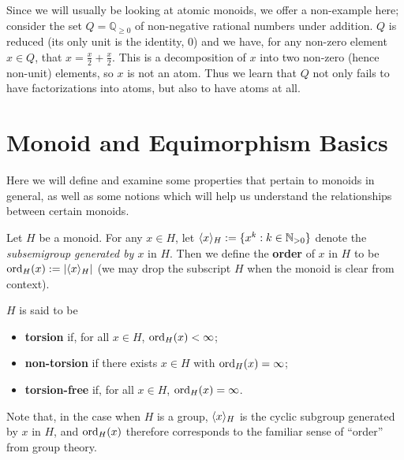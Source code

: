\begin{eg} \label{eg: non-atomic monoid}
Since we will usually be looking at atomic monoids, we offer a non-example here; consider the set $Q = \mathbb{Q}_{\ge 0}$ of non-negative rational numbers under addition.
$Q$ is reduced (its only unit is the identity, $0$) and we have, for any non-zero element $x\in Q$, that $x = \frac{x}{2} + \frac{x}{2}$.
This is a decomposition of $x$ into two non-zero (hence non-unit) elements, so $x$ is not an atom.
Thus we learn that $Q$ not only fails to have factorizations into atoms, but also to have atoms at all.
\end{eg}

\section{Monoid and Equimorphism Basics} \label{sec:monoids}
Here we will define and examine some properties that pertain to monoids in general, as well as some notions which will help us understand the relationships between certain monoids.

\begin{defn} \label{def:torsion}
	Let $H$ be a monoid.
	For any $x\in H$, let $\langle x \rangle_H := \{x^k: k\in \mathbb{N}_{>0} \}$ denote the \textit{subsemigroup generated by $x$} in $H$.
	Then we define the \textbf{order} of $x$ in $H$ to be ${\operatorname{ord}}_H(x) := | \langle x \rangle_H|$ (we may drop the subscript $H$ when the monoid is clear from context).
	
	$H$ is said to be
	\begin{itemize}
		\item \textbf{torsion} if, for all $x\in H$, ${\operatorname{ord}}_H(x)<\infty$;
		\item \textbf{non-torsion} if there exists $x\in H$ with ${\operatorname{ord}}_H(x) = \infty$;
		\item \textbf{torsion-free} if, for all $x\in H$, ${\operatorname{ord}}_H(x) = \infty$.
	\end{itemize}
\end{defn}

Note that, in the case when $H$ is a group, $\langle x \rangle_H$ is the cyclic subgroup generated by $x$ in $H$, and ${\operatorname{ord}}_H(x)$ therefore corresponds to the familiar sense of ``order'' from group theory.


